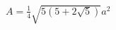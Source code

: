 \documentclass[preview]{standalone}
\begin{document}
\begin{center}
$A = \frac{1}{4}\sqrt{5(5+2\sqrt{5})}a^2$
\end{center}
\end{document}
